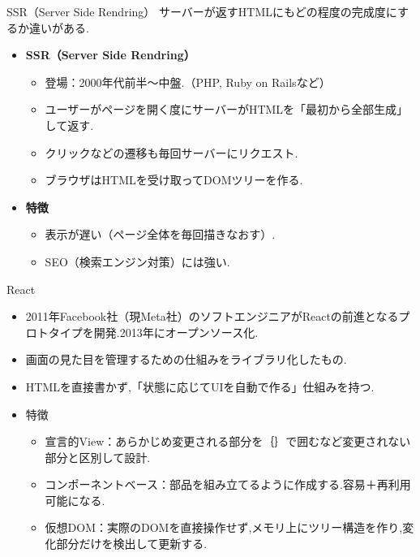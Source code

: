 \documentclass[aspectratio=169]{beamer}
\begin{document}
\begin{frame}{SSR（Server Side Rendring）}
    サーバーが返すHTMLにもどの程度の完成度にするか違いがある.\\
    \begin{itemize}
        \setlength{\parskip}{1em}
        \item \textbf{SSR（Server Side Rendring）}
        \begin{itemize}
            \setlength{\parskip}{1em}
            \item 登場：2000年代前半～中盤.（PHP, Ruby on Railsなど）
            \item ユーザーがページを開く度にサーバーがHTMLを「最初から全部生成」して返す.
            \item クリックなどの遷移も毎回サーバーにリクエスト.
            \item ブラウザはHTMLを受け取ってDOMツリーを作る.
        \end{itemize}
        \item \textbf{特徴}
        \begin{itemize}
            \setlength{\parskip}{1em}
            \item 表示が遅い（ページ全体を毎回描きなおす）.
            \item SEO（検索エンジン対策）には強い.
        \end{itemize}
    \end{itemize}
\end{frame}

\begin{frame}{React}
    \begin{itemize}
        \setlength{\parskip}{1em}
        \item 2011年Facebook社（現Meta社）のソフトエンジニアがReactの前進となるプロトタイプを開発.2013年にオープンソース化.
        \item 画面の見た目を管理するための仕組みをライブラリ化したもの.
        \item HTMLを直接書かず,「状態に応じてUIを自動で作る」仕組みを持つ.
        \item 特徴
        \begin{itemize}
            \setlength{\parskip}{1em}
            \item 宣言的View：あらかじめ変更される部分を｛｝で囲むなど変更されない部分と区別して設計.
            \item コンポーネントベース：部品を組み立てるように作成する.容易＋再利用可能になる.
            \item 仮想DOM：実際のDOMを直接操作せず,メモリ上にツリー構造を作り,変化部分だけを検出して更新する.
        \end{itemize}
    \end{itemize}    
\end{frame}
\end{document}
